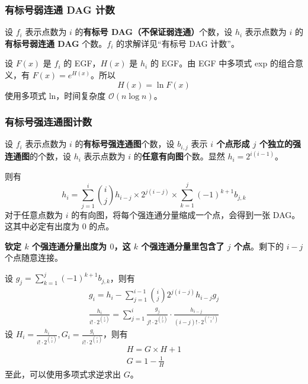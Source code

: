 
\subsubsection{有标号弱连通 DAG 计数}

设 $f_i$ 表示点数为 $i$ 的\textbf{有标号 DAG（不保证弱连通）}个数，设 $h_i$ 表示点数为 $i$ 的\textbf{有标号弱连通 DAG} 个数。$f_i$ 的求解详见“有标号 DAG 计数”。

设 $F(x)$ 是 $f_i$ 的 EGF，$H(x)$ 是 $h_i$ 的 EGF。由 EGF 中多项式 exp 的组合意义，有 $F(x) = e^{H(x)}$。所以
\[
H(x) = \ln F(x)
\]
使用多项式 ln，时间复杂度 $\mathcal{O}(n \log n)$。


\subsubsection{有标号强连通图计数}

设 $f_i$ 表示点数为 $i$ 的\textbf{有标号强连通图}个数，设 $b_{i, j}$ 表示 \textbf{$i$ 个点形成 $j$ 个独立的强连通图}的个数，设 $h_i$ 表示点数为 $i$ 的\textbf{任意有向图}个数。显然 $h_i = 2^{i(i - 1)}$。

则有
\[
h_i = \sum_{j = 1}^i \binom{i}{j} h_{i - j}\times 2^{j(i - j)} \times \sum_{k = 1}^{j}(-1)^{k + 1}b_{j, k}
\]
对于任意点数为 $i$ 的有向图，将每个强连通分量缩成一个点，会得到一张 DAG。这其中必定有出度为 $0$ 的点。

\textbf{钦定 $k$ 个强连通分量出度为 $0$，这 $k$ 个强连通分量里包含了 $j$ 个点}。剩下的 $i - j$ 个点随意连接。

设 $g_j = \sum_{k = 1}^j (-1)^{k + 1}b_{j, k}$，则有
\[
\begin{gathered}
g_i = h_i - \sum_{j = 1}^{i - 1} \binom{i}{j} 2^{j(i - j)} h_{i - j} g_j \\
\frac{h_i}{i! \cdot 2^{\binom{i}{2}}} = \sum_{j = 1}^i \frac{g_j}{j! \cdot 2^{\binom{j}{2}}} \cdot \frac{h_{i - j}}{(i - j)! \cdot 2^{\binom{i - j}{2}}}
\end{gathered}
\]
设 $H_i = \frac{h_i}{i! \cdot 2^{\binom{i}{2}}}, G_i = \frac{g_i}{i! \cdot 2^{\binom{i}{2}}}$，则有
\[
\begin{gathered}
H = G \times H + 1 \\
G = 1 - \frac{1}{H}
\end{gathered}
\]
至此，可以使用多项式求逆求出 $G$。

